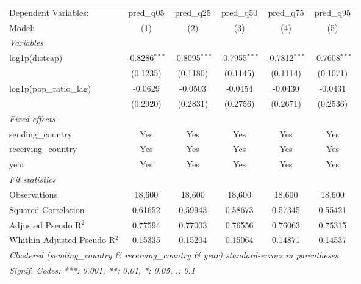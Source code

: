 
\begingroup
\centering
\begin{tabular}{lccccc}
   \tabularnewline \midrule \midrule
   Dependent Variables:          & pred\_q05       & pred\_q25       & pred\_q50       & pred\_q75       & pred\_q95\\   
   Model:                        & (1)             & (2)             & (3)             & (4)             & (5)\\  
   \midrule
   \emph{Variables}\\
   log1p(distcap)                & -0.8286$^{***}$ & -0.8095$^{***}$ & -0.7955$^{***}$ & -0.7812$^{***}$ & -0.7608$^{***}$\\   
                                 & (0.1235)        & (0.1180)        & (0.1145)        & (0.1114)        & (0.1071)\\   
   log1p(pop\_ratio\_lag)        & -0.0629         & -0.0503         & -0.0454         & -0.0430         & -0.0431\\   
                                 & (0.2920)        & (0.2831)        & (0.2756)        & (0.2671)        & (0.2536)\\   
   \midrule
   \emph{Fixed-effects}\\
   sending\_country              & Yes             & Yes             & Yes             & Yes             & Yes\\  
   receiving\_country            & Yes             & Yes             & Yes             & Yes             & Yes\\  
   year                          & Yes             & Yes             & Yes             & Yes             & Yes\\  
   \midrule
   \emph{Fit statistics}\\
   Observations                  & 18,600          & 18,600          & 18,600          & 18,600          & 18,600\\  
   Squared Correlation           & 0.61652         & 0.59943         & 0.58673         & 0.57345         & 0.55421\\  
   Adjusted Pseudo R$^2$         & 0.77594         & 0.77003         & 0.76556         & 0.76063         & 0.75315\\  
   Whithin Adjusted Pseudo R$^2$ & 0.15335         & 0.15204         & 0.15064         & 0.14871         & 0.14537\\  
   \midrule \midrule
   \multicolumn{6}{l}{\emph{Clustered (sending\_country \& receiving\_country \& year) standard-errors in parentheses}}\\
   \multicolumn{6}{l}{\emph{Signif. Codes: ***: 0.001, **: 0.01, *: 0.05, .: 0.1}}\\
\end{tabular}
\par\endgroup


